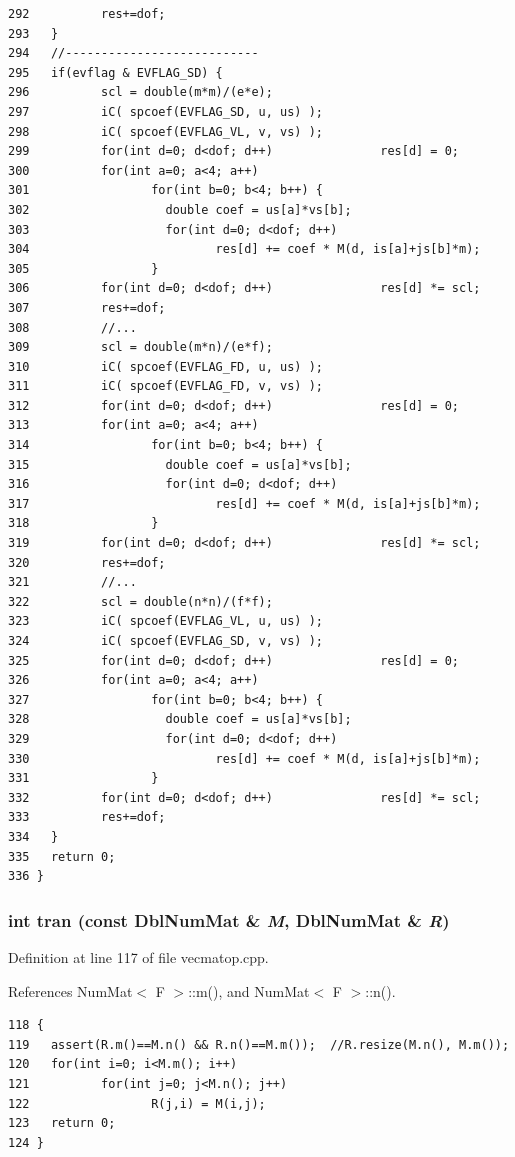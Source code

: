 \begin{verbatim}
292          res+=dof;
293   }
294   //---------------------------
295   if(evflag & EVFLAG_SD) {
296          scl = double(m*m)/(e*e);
297          iC( spcoef(EVFLAG_SD, u, us) );
298          iC( spcoef(EVFLAG_VL, v, vs) );
299          for(int d=0; d<dof; d++)               res[d] = 0;
300          for(int a=0; a<4; a++)
301                 for(int b=0; b<4; b++) {
302                   double coef = us[a]*vs[b]; 
303                   for(int d=0; d<dof; d++)
304                          res[d] += coef * M(d, is[a]+js[b]*m);
305                 }
306          for(int d=0; d<dof; d++)               res[d] *= scl;
307          res+=dof;
308          //...
309          scl = double(m*n)/(e*f);
310          iC( spcoef(EVFLAG_FD, u, us) );
311          iC( spcoef(EVFLAG_FD, v, vs) );
312          for(int d=0; d<dof; d++)               res[d] = 0;
313          for(int a=0; a<4; a++)
314                 for(int b=0; b<4; b++) {
315                   double coef = us[a]*vs[b]; 
316                   for(int d=0; d<dof; d++)
317                          res[d] += coef * M(d, is[a]+js[b]*m);
318                 }
319          for(int d=0; d<dof; d++)               res[d] *= scl;
320          res+=dof;
321          //...
322          scl = double(n*n)/(f*f);
323          iC( spcoef(EVFLAG_VL, u, us) );
324          iC( spcoef(EVFLAG_SD, v, vs) );
325          for(int d=0; d<dof; d++)               res[d] = 0;
326          for(int a=0; a<4; a++)
327                 for(int b=0; b<4; b++) {
328                   double coef = us[a]*vs[b]; 
329                   for(int d=0; d<dof; d++)
330                          res[d] += coef * M(d, is[a]+js[b]*m);
331                 }
332          for(int d=0; d<dof; d++)               res[d] *= scl;
333          res+=dof;
334   }
335   return 0;
336 }
\end{verbatim}\normalsize 


\subsubsection{\setlength{\rightskip}{0pt plus 5cm}int tran (const {\bf Dbl\-Num\-Mat} \& {\em M}, {\bf Dbl\-Num\-Mat} \& {\em R})}\label{vecmatop_8hpp_2db1bb0aad5cb3c8b5155fb7f23d7b38_2db1bb0aad5cb3c8b5155fb7f23d7b38}




Definition at line 117 of file vecmatop.cpp.

References Num\-Mat$<$ F $>$::m(), and Num\-Mat$<$ F $>$::n().

\footnotesize\begin{verbatim}118 {
119   assert(R.m()==M.n() && R.n()==M.m());  //R.resize(M.n(), M.m());
120   for(int i=0; i<M.m(); i++)
121          for(int j=0; j<M.n(); j++)
122                 R(j,i) = M(i,j);
123   return 0;
124 }
\end{verbatim}\normalsize 


